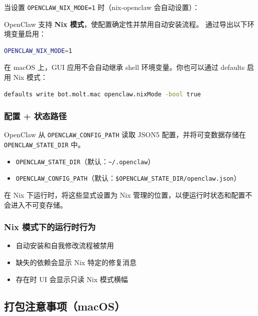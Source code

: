 当设置 \texttt{OPENCLAW\_NIX\_MODE=1} 时（nix-openclaw 会自动设置）：

OpenClaw 支持 \textbf{Nix 模式}，使配置确定性并禁用自动安装流程。
通过导出以下环境变量启用：

\begin{lstlisting}[language=bash]
OPENCLAW_NIX_MODE=1
\end{lstlisting}


在 macOS 上，GUI 应用不会自动继承 shell 环境变量。你也可以通过 defaults 启用 Nix 模式：

\begin{lstlisting}[language=bash]
defaults write bot.molt.mac openclaw.nixMode -bool true
\end{lstlisting}


\subsubsection{配置 + 状态路径}


OpenClaw 从 \texttt{OPENCLAW\_CONFIG\_PATH} 读取 JSON5 配置，并将可变数据存储在 \texttt{OPENCLAW\_STATE\_DIR} 中。

\begin{itemize}
  \item \texttt{OPENCLAW\_STATE\_DIR}（默认：\texttt{\textasciitilde{}/.openclaw}）
  \item \texttt{OPENCLAW\_CONFIG\_PATH}（默认：\texttt{\$OPENCLAW\_STATE\_DIR/openclaw.json}）
\end{itemize}


在 Nix 下运行时，将这些显式设置为 Nix 管理的位置，以便运行时状态和配置不会进入不可变存储。

\subsubsection{Nix 模式下的运行时行为}


\begin{itemize}
  \item 自动安装和自我修改流程被禁用
  \item 缺失的依赖会显示 Nix 特定的修复消息
  \item 存在时 UI 会显示只读 Nix 模式横幅
\end{itemize}


\subsection{打包注意事项（macOS）}


